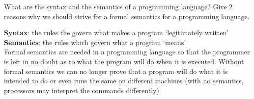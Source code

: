 \documentclass{exam}
\begin{document}
\begin{questions}
\question[6]What are the syntax and the semantics of a programming language?
Give 2 reasons why we should strive for a formal semantics for a programming
language.
\begin{solution}[2in]
	\textbf{Syntax}: the rules the govern what makes a program ‘legitimately written’\\
	\textbf{Semantics}: the rules which govern what a program ‘means’\\
	Formal semantics are needed in a programming language so that the programmer is left in no doubt as to what the program will do when it is executed. Without formal semantics we can no longer prove that a program will do what it is intended to do or even runs the same on different machines (with no semantics, processors may interpret the commands differently)
\end{solution}






\end{questions}
\end{document}
